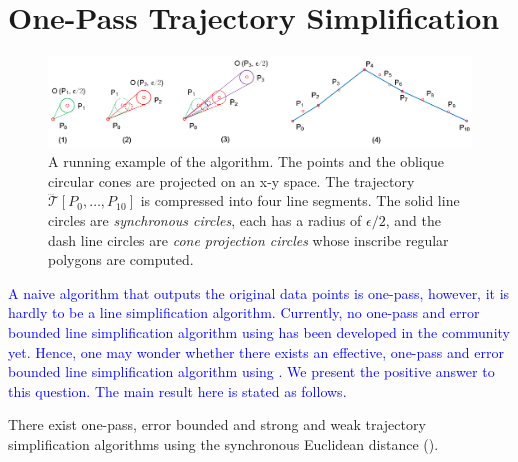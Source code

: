 \section{One-Pass Trajectory Simplification}
\label{sec-alg}


\begin{figure}[tb!]
	\centering
	\includegraphics[scale=0.8]{figures/Fig-Ex-Conest.png}
	\caption{\small A running example of the \cist algorithm. The points and the oblique circular cones are projected on an x-y space. The trajectory $\dddot{\mathcal{T}}[P_0, \ldots, P_{10}]$ is compressed into four line segments. The solid line circles are \emph{synchronous circles}, each has a radius of $\epsilon/2$, and the dash line circles are \emph{cone projection circles} whose inscribe regular polygons are computed.}
	\label{fig:exm-const}
\end{figure}

\textcolor{blue}{A naive algorithm that outputs the original data points is one-pass, however, it is hardly to be a line simplification algorithm. Currently, no one-pass and error bounded line simplification algorithm using \sed has been developed in the community yet.
Hence, one may wonder whether there exists an effective, one-pass and error bounded line simplification algorithm using \sed.
We present the positive answer to this question. The main result here is stated as follows.}

\begin{theorem}
\label{prop-cist-op}
There exist one-pass, error bounded and strong and weak trajectory simplification algorithms using the synchronous Euclidean distance (\sed).
\end{theorem}

